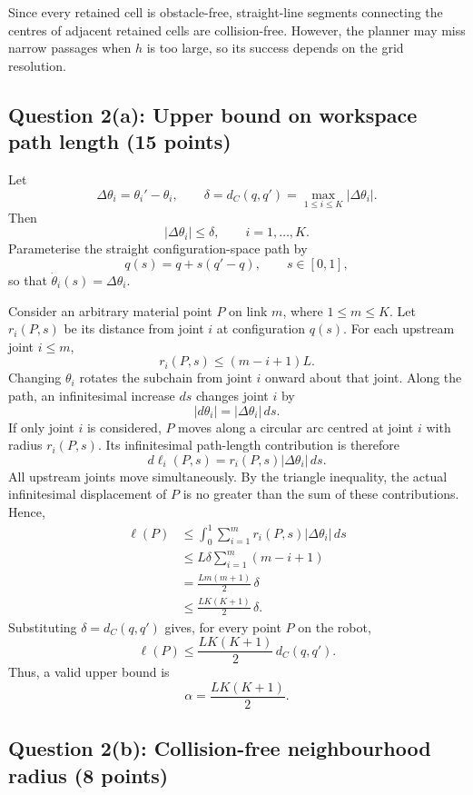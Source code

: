 \documentclass[11pt,a4paper]{article}
\begin{document}
\noindent
Since every retained cell is obstacle-free, straight-line segments connecting
the centres of adjacent retained cells are collision-free. However, the
planner may miss narrow passages when $h$ is too large, so its success depends
on the grid resolution.

\clearpage
\subsection*{Question 2(a): Upper bound on workspace path length (15 points)}

\noindent
Let
\[
  \Delta\theta_i=\theta_i'-\theta_i,
  \qquad
  \delta=d_C(q,q')
  =\max_{1\leq i\leq K}|\Delta\theta_i|.
\]
Then
\[
  |\Delta\theta_i|\leq\delta,
  \qquad i=1,\ldots,K.
\]
Parameterise the straight configuration-space path by
\[
  q(s)=q+s(q'-q),
  \qquad s\in[0,1],
\]
so that $\dot{\theta}_i(s)=\Delta\theta_i$.

\noindent
Consider an arbitrary material point $P$ on link $m$, where
$1\leq m\leq K$.  Let $r_i(P,s)$ be its distance from joint $i$ at
configuration $q(s)$.  For each upstream joint $i\leq m$,
\[
  r_i(P,s)\leq(m-i+1)L.
\]
Changing $\theta_i$ rotates the subchain from joint $i$ onward about that
joint.  Along the path, an infinitesimal increase $ds$ changes joint $i$ by
\[
  |d\theta_i|=|\Delta\theta_i|\,ds.
\]
If only joint $i$ is considered, $P$ moves along a circular arc centred at
joint $i$ with radius $r_i(P,s)$.  Its infinitesimal path-length contribution
is therefore
\[
  d\ell_i(P,s)=r_i(P,s)|\Delta\theta_i|\,ds.
\]
All upstream joints move simultaneously.  By the triangle inequality, the
actual infinitesimal displacement of $P$ is no greater than the sum of these
contributions.  Hence,
\[
  \begin{aligned}
    \ell(P)
    &\leq \int_0^1
      \sum_{i=1}^{m}r_i(P,s)|\Delta\theta_i|\,ds\\
    &\leq
      L\delta\sum_{i=1}^{m}(m-i+1)\\
    &=\frac{Lm(m+1)}{2}\,\delta\\
    &\leq\frac{LK(K+1)}{2}\,\delta.
  \end{aligned}
\]
Substituting $\delta=d_C(q,q')$ gives, for every point $P$ on the robot,
\[
  \boxed{
    \ell(P)
    \leq
    \frac{LK(K+1)}{2}\,d_C(q,q')
  }.
\]
Thus, a valid upper bound is
\[
  \boxed{\alpha=\frac{LK(K+1)}{2}}.
\]

\clearpage
\subsection*{Question 2(b): Collision-free neighbourhood radius (8 points)}
\end{document}
